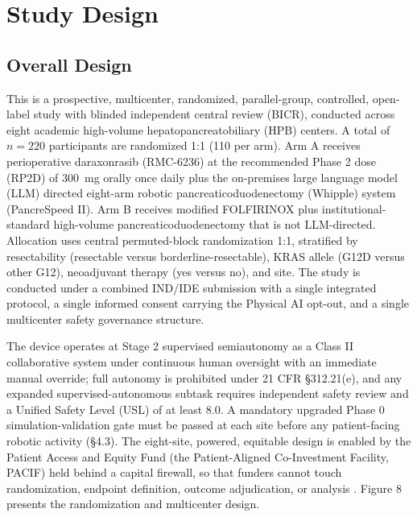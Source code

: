 \section{Study Design}

\subsection{Overall Design}

This is a prospective, multicenter, randomized, parallel-group, controlled,
open-label study with blinded independent central review (BICR), conducted across
eight academic high-volume hepatopancreatobiliary (HPB) centers. A total of
$n=220$ participants are randomized 1:1 (110 per arm). Arm A receives perioperative
daraxonrasib (RMC-6236) at the recommended Phase 2 dose (RP2D) of 300~mg orally
once daily plus the on-premises large language model (LLM) directed eight-arm
robotic pancreaticoduodenectomy (Whipple) system (PancreSpeed II). Arm B receives
modified FOLFIRINOX \cite{Conroy2018} plus institutional-standard high-volume
pancreaticoduodenectomy that is not LLM-directed. Allocation uses central
permuted-block randomization 1:1, stratified by resectability (resectable versus
borderline-resectable), KRAS allele (G12D versus other G12), neoadjuvant therapy
(yes versus no), and site. The study is conducted under a combined IND/IDE
submission with a single integrated protocol, a single informed consent carrying
the Physical AI opt-out, and a single multicenter safety governance structure.

The device operates at Stage 2 supervised semiautonomy as a Class II collaborative
system under continuous human oversight with an immediate manual override; full
autonomy is prohibited under 21 CFR \S312.21(e), and any expanded
supervised-autonomous subtask requires independent safety review and a Unified
Safety Level (USL) of at least 8.0. A mandatory upgraded Phase 0
simulation-validation gate must be passed at each site before any patient-facing
robotic activity (\S4.3). The eight-site, powered, equitable design is enabled by
the Patient Access and Equity Fund (the Patient-Aligned Co-Investment Facility,
PACIF) held behind a capital firewall, so that funders cannot touch randomization,
endpoint definition, outcome adjudication, or analysis \cite{kawchak2026hr9510,ecfr2026part54}.
Figure 8 presents the randomization and multicenter design.

